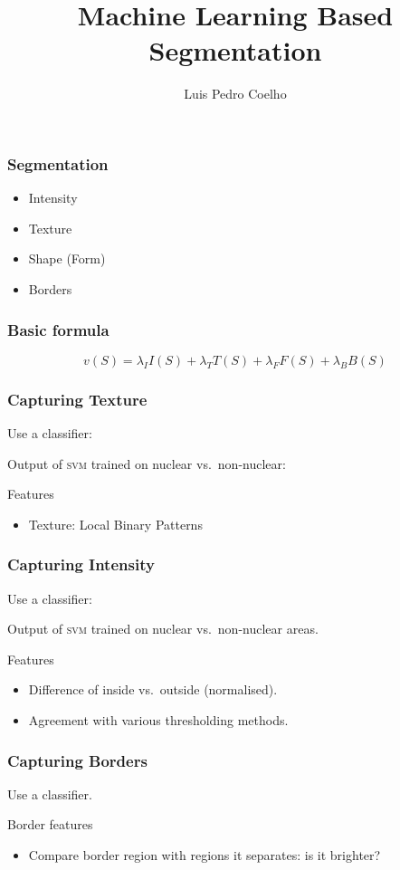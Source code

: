 \documentclass{beamer}
\title{Machine Learning Based Segmentation}
\author{Luis Pedro Coelho}
\institute[CPCB]{Joint \textsc{cmu}-Pitt PhD.\ in Computational Biology}
\begin{document}
\frame{\titlepage}

\begin{frame}[fragile]
\frametitle{Segmentation}
\begin{itemize}
\item Intensity
\item Texture
\item Shape (Form)
\item Borders
\end{itemize}
\end{frame}

\begin{frame}[fragile]
\frametitle{Basic formula}

\[
v(S) = \lambda_I I(S) + \lambda_T T(S) + \lambda_F F(S) + \lambda_B B(S)
\]

\end{frame}

\begin{frame}[fragile]
\frametitle{Capturing Texture}

Use a classifier:
\pause
\bigskip


Output of \textsc{svm} trained on nuclear vs.\ non-nuclear:

\begin{block}{Features}
\begin{itemize}
\item Texture: Local Binary Patterns
\end{itemize}
\end{block}

\end{frame}

\begin{frame}[fragile]
\frametitle{Capturing Intensity}

Use a classifier:

\pause
\bigskip

Output of \textsc{svm} trained on nuclear vs.\ non-nuclear areas.

\begin{block}{Features}
\begin{itemize}
\item Difference of inside vs.\ outside (normalised).
\item Agreement with \alert{various} thresholding methods.
\end{itemize}
\end{block}

\end{frame}

\begin{frame}[fragile]
\frametitle{Capturing Borders}

Use a classifier.
\pause
\bigskip

\begin{block}{Border features}
\begin{itemize}
\item Compare border region with regions it separates:
    is it brighter?
\end{itemize}
\end{block}

\end{frame}
\end{document}
